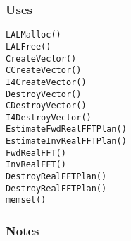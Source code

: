 \subsubsection*{Uses}
\begin{verbatim}
LALMalloc()
LALFree()
CreateVector()
CCreateVector()
I4CreateVector()
DestroyVector()
CDestroyVector()
I4DestroyVector()
EstimateFwdRealFFTPlan()
EstimateInvRealFFTPlan()
FwdRealFFT()
InvRealFFT()
DestroyRealFFTPlan()
DestroyRealFFTPlan()
memset()
\end{verbatim}

\subsubsection*{Notes}

